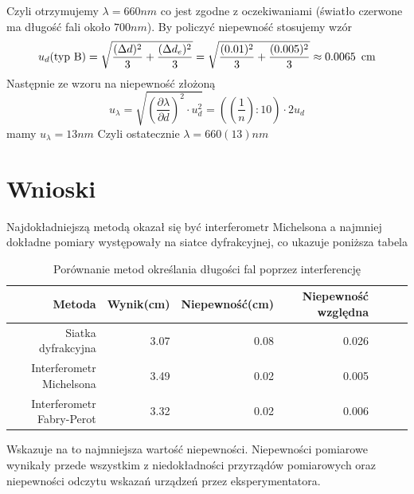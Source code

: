 \documentclass[a4paper]{article}
\begin{document}
Czyli otrzymujemy $\lambda = 660nm$ co jest zgodne z oczekiwaniami (światło czerwone ma długość fali około $700 nm$). By policzyć niepewność stosujemy wzór $$u_d (\text{typ B}) = \sqrt{\frac{(\Delta d)^2}{3} + \frac{(\Delta d_e)^2}{3}} = \sqrt{\frac{(0.01)^2}{3} + \frac{(0.005)^2}{3}} \approx 0.0065 \enskip \text{cm}$$
Następnie ze wzoru na niepewność złożoną
$$u_{\lambda} = \sqrt{(\frac{\partial \lambda}{\partial d})^2 \cdot u_d^2 } = ((\frac{1}{n}):10) \cdot 2 u_d$$
mamy 
$u_{\lambda} = 13nm$
Czyli ostatecznie $\lambda = 660(13)nm$
\section{Wnioski}
Najdokładniejszą metodą okazał się być interferometr Michelsona a najmniej dokładne pomiary występowały na siatce dyfrakcyjnej, co ukazuje poniższa tabela

\begin{table}[h!]
\begin{tabular}{rrrrrrr}
\toprule
Metoda & Wynik(cm) & Niepewność(cm) & Niepewność względna\\
\midrule
Siatka dyfrakcyjna & 3.07 & 0.08 & 0.026\\
Interferometr Michelsona & 3.49 & 0.02 & 0.005\\
Interferometr Fabry-Perot & 3.32 & 0.02 & 0.006\\
\bottomrule
\end{tabular}
\caption{Porównanie metod określania długości fal poprzez interferencję}
\label{porownanie_metod}
\end{table}

Wskazuje na to najmniejsza wartość niepewności. Niepewności pomiarowe wynikały przede
wszystkim z niedokładności przyrządów pomiarowych oraz niepewności odczytu wskazań urządzeń
przez eksperymentatora.
\end{document}
